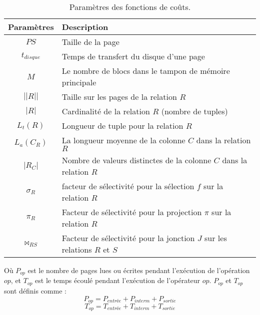 \begin{table}
\centering
\caption {Paramètres des fonctions de coûts.} \label{tab:cost-func-param}
\begin{tabular}{cl}
    \toprule
    \textbf{Paramètres} & \textbf{Description} \\
    \midrule
	$PS$ & Taille de la page \\
	$t_{disque}$ & Temps de transfert du disque d'une page \\
	$M$ & Le nombre de blocs dans le tampon de mémoire principale \\
	$||R||$ & Taille sur les pages de la relation $R$ \\
	$|R|$ & Cardinalité de la relation $R$ (nombre de tuples) \\
	$L_t(R)$ & Longueur de tuple pour la relation $R$ \\
	$L_a(C_R)$ & La longueur moyenne de la colonne $C$ dans la relation $R$ \\
	$|R_C|$ & Nombre de valeurs distinctes de la colonne $C$ dans la relation $R$ \\
	$\sigma_R$ & facteur de sélectivité pour la sélection $f$ sur la relation $R$ \\
	$\pi_R$ & Facteur de sélectivité pour la projection $\pi$ sur la relation $R$ \\
	$\bowtie_{RS}$ & Facteur de sélectivité pour la jonction $J$ sur les relations $R$ et $S$ \\
    \bottomrule
\end{tabular}
\end{table}

Où $P_{op}$ est le nombre de pages lues ou écrites pendant l'exécution de l'opération $op$, et $T_{op}$ est le temps écoulé pendant l'exécution de l'opérateur $op$. $P_{op}$ et $T_{op}$ sont définis comme :
\begin{equation}
 P_{op} = P_{entrée} + P_{interm} + P_{sortie}
\end{equation}
\begin{equation}
 T_{op} = T_{entrée} + T_{interm} + T_{sortie}
\end{equation}

